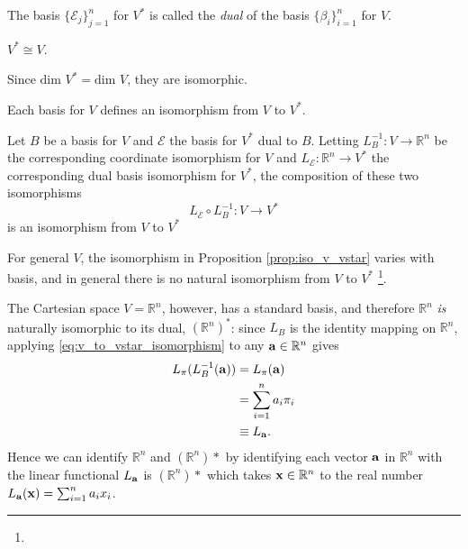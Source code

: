 \documentclass[12pt,letterpaper,reqno]{article}
\numberwithin{equation}{section}
\newcommand{\ti}[1]{\textit{#1}}
\newcommand{\fixme}[1]{{\color{orange}{[#1]}}}
\begin{document}
\begin{defn}
	The basis $\{\mathscr{E}_j\}_{j=1}^n$ for $V^*$ is called the \ti{dual} of the basis $\{\beta_i\}_{i=1}^n$ for $V$.
\end{defn}

\begin{cor}[$V^*$ is isomorphic to $V$]
$V^* \cong V$. 	
\end{cor}

\begin{pf}
Since $\text{dim }V^*=\text{dim }V$, they are isomorphic.	
\end{pf}

\begin{prop}\label{prop:iso_v_vstar}
	Each basis for $V$ defines an isomorphism from $V$ to $V^*$.
\end{prop}

\begin{pf}
Let $B$ be a basis for $V$ and $\mathscr{E}$ the basis for $V^*$ dual to $B$. Letting $L_B^{-1}:V \to \mathbb{R}^n$ be the corresponding coordinate isomorphism for $V$ and $L_\mathscr{E}:\mathbb{R}^n \to V^*$ the corresponding dual basis isomorphism for $V^*$, the composition of these two isomorphisms
\begin{equation}\label{eq:v_to_vstar_isomorphism}
	 L_\mathscr{E}\circ L_B^{-1}:V \to V^*
\end{equation}	
is an isomorphism from $V$ to $V^*$
\end{pf}
For general $V$, the isomorphism in Proposition \ref{prop:iso_v_vstar} varies with basis, and in general there is no natural isomorphism from $V$ to $V^*$ \footnote{\fixme{Need to define natural isomorphism more precisely somewhere. Here, it is clear that there is no isomorphism which stands out from any other choice as being a standard choice.}}.

The Cartesian space $V=\mathbb{R}^n$, however, has a standard basis, and therefore $\mathbb{R}^n$ \ti{is} naturally isomorphic to its dual, $(\mathbb{R}^n)^*$: since $L_B$ is the identity mapping on $\mathbb{R}^n$, applying \eqref{eq:v_to_vstar_isomorphism} to any ${\bf a} \in \mathbb{R}^n$ gives
\begin{align*}
	L_\pi(L_B^{-1}({\bf a}))&=L_\pi({\bf a}) \\
	&=\sum_{i=1}^na_i\pi_i \\
	&\equiv L_{\bf a}.
\end{align*}
Hence we can identify $\mathbb{R}^n$ and $(\mathbb{R}^n)*$ by identifying each vector ${\bf a }$ in $\mathbb{R}^n$ with the linear functional $L_{\bf a}$ is $(\mathbb{R}^n)*$ which takes ${\bf x} \in \mathbb{R}^n$ to the real number $L_{\bf a}({\bf x})=\sum_{i=1}^na_ix_i$.
\end{document}
